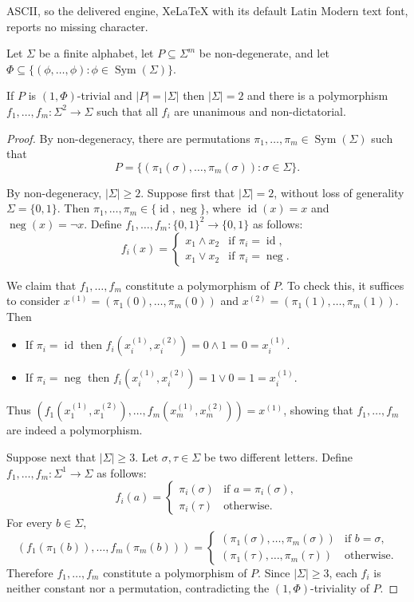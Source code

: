 \documentclass[10pt,a4paper]{amsart}
\DeclareMathOperator{\Neg}{neg}
\DeclareMathOperator{\Sym}{Sym}
\DeclareMathOperator{\id}{id}
\begin{document}
ASCII, so the delivered engine, XeLaTeX with its default Latin Modern text font, reports no missing character.
\begin{lemma}
\label{lem:filmus-identical}
Let $\Sigma$ be a finite alphabet, let $P \subseteq \Sigma^m$ be non-degenerate, and let $\Phi \subseteq \{(\phi,\dots,\phi) : \phi \in \Sym(\Sigma)\}$.

If $P$ is $(1,\Phi)$-trivial and $|P| = |\Sigma|$ then $|\Sigma| = 2$ and there is a polymorphism $f_1,\dots,f_m\colon \Sigma^2 \to \Sigma$ such that all $f_i$ are unanimous and non-dictatorial.
\end{lemma}

\begin{proof}
By non-degeneracy, there are permutations $\pi_1,\dots,\pi_m \in \Sym(\Sigma)$ such that
\[
 P = \{(\pi_1(\sigma),\dots,\pi_m(\sigma)) : \sigma \in \Sigma\}.
\]

By non-degeneracy, $|\Sigma| \ge 2$. Suppose first that $|\Sigma| = 2$, without loss of generality $\Sigma = \{0,1\}$. Then $\pi_1,\dots,\pi_m \in \{\id,\Neg\}$, where $\id(x) = x$ and $\Neg(x) = \lnot x$. Define $f_1,\dots,f_m\colon \{0,1\}^2 \to \{0,1\}$ as follows:
\[
 f_i(x) =
 \begin{cases}
 x_1 \land x_2 & \text{if } \pi_i = \id, \\
 x_1 \lor x_2 & \text{if } \pi_i = \Neg.
 \end{cases}
\]

We claim that $f_1,\dots,f_m$ constitute a polymorphism of $P$. To check this, it suffices to consider $x^{(1)} = (\pi_1(0), \dots, \pi_m(0))$ and $x^{(2)} = (\pi_1(1), \dots, \pi_m(1))$. Then
\begin{itemize}
\item If $\pi_i = \id$ then $f_i(x^{(1)}_i,x^{(2)}_i) = 0 \land 1 = 0 = x^{(1)}_i$.
\item If $\pi_i = \Neg$ then $f_i(x^{(1)}_i,x^{(2)}_i) = 1 \lor 0 = 1 = x^{(1)}_i$.
\end{itemize}
Thus $(f_1(x^{(1)}_1,x^{(2)}_1), \dots, f_m(x^{(1)}_m,x^{(2)}_m)) = x^{(1)}$, showing that $f_1,\dots,f_m$ are indeed a polymorphism.

Suppose next that $|\Sigma| \ge 3$. Let $\sigma,\tau \in \Sigma$ be two different letters. Define $f_1,\dots,f_m\colon \Sigma^1 \to \Sigma$ as follows:
\[
 f_i(a) =
 \begin{cases}
     \pi_i(\sigma) & \text{if } a = \pi_i(\sigma), \\
     \pi_i(\tau) & \text{otherwise}.
 \end{cases}
\]
For every $b \in \Sigma$,
\[
 (f_1(\pi_1(b)), \dots, f_m(\pi_m(b))) =
 \begin{cases}
     (\pi_1(\sigma),\dots,\pi_m(\sigma)) & \text{if } b = \sigma, \\
     (\pi_1(\tau),\dots,\pi_m(\tau)) & \text{otherwise}.
 \end{cases}
\]
Therefore $f_1,\dots,f_m$ constitute a polymorphism of $P$. Since $|\Sigma| \ge 3$, each $f_i$ is neither constant nor a permutation, contradicting the $(1,\Phi)$-triviality of $P$.
\end{proof}
\end{document}

